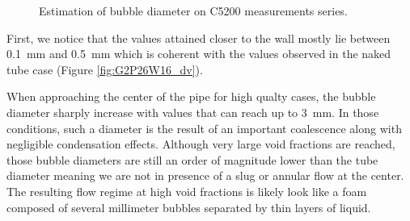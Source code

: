 \begin{figure}[!h]
\centering
{}

\caption{Estimation of bubble diameter on C5200 measurements series.}
\label{fig:exp_C52_dvap}
\end{figure}

\npar

First, we notice that the values attained closer to the wall mostly lie between 0.1\ mm and 0.5\ mm which is coherent with the values observed in the naked tube case (Figure \ref{fig:G2P26W16_dv}).

\npar

When approaching the center of the pipe for high qualty cases, the bubble diameter sharply increase with values that can reach up to 3\ mm. In those conditions, such a diameter is the result of an important coalescence along with negligible condensation effects. Although very large void fractions are reached, those bubble diameters are still an order of magnitude lower than the tube diameter meaning we are not in presence of a slug or annular flow at the center. The resulting flow regime at high void fractions is likely look like a foam composed of several millimeter bubbles separated by thin layers of liquid.

